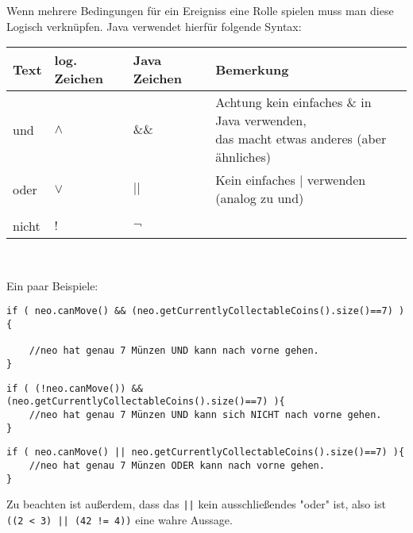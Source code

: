 \begin{Infobox}

	Wenn mehrere Bedingungen für ein Ereigniss eine Rolle spielen muss man diese Logisch verknüpfen. 
	Java verwendet hierfür folgende Syntax:
	\begin{center}
		\begin{tabular}{ l | l | l | l}
			Text & log. Zeichen & Java Zeichen & Bemerkung \\ \hline
			und  & $\land$ & $\&\&$ & \minibox{
					Achtung kein einfaches \& in Java verwenden,\\ 
					das macht etwas anderes (aber ähnliches)
			} \\
			oder & $\lor$ & $||$ & Kein einfaches $|$ verwenden (analog zu und) \\
			& &  \\
			nicht & $!$ & $\neg$ &\\
		\end{tabular}\\
	\end{center}

	Ein paar Beispiele:

	\begin{lstlisting}
if ( neo.canMove() && (neo.getCurrentlyCollectableCoins().size()==7) ){

	//neo hat genau 7 Münzen UND kann nach vorne gehen.
}
	\end{lstlisting}

	\begin{lstlisting}
if ( (!neo.canMove()) && (neo.getCurrentlyCollectableCoins().size()==7) ){
	//neo hat genau 7 Münzen UND kann sich NICHT nach vorne gehen.
}
	\end{lstlisting}

	\begin{lstlisting}
if ( neo.canMove() || neo.getCurrentlyCollectableCoins().size()==7) ){
	//neo hat genau 7 Münzen ODER kann nach vorne gehen.
}
	\end{lstlisting}

	Zu beachten ist außerdem, dass das  \lstinline{||} kein ausschließendes "oder" ist, also ist \lstinline{((2 < 3) || (42 != 4))} eine wahre Aussage.

\end{Infobox}



